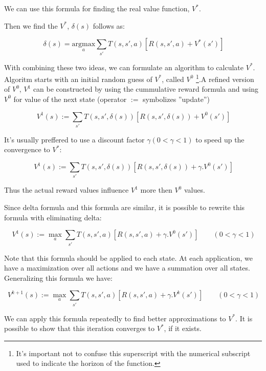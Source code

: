 We can use this formula for finding the real value function, $V^*$.

Then we find the $V^*$, $\delta(s)$ follows as:

\begin{displaymath}
\ \delta(s) = \underset{a}{\mbox{argmax}} \sum_{s'} T(s,s',a) [ R(s, s', a) + V^* (s')]
\end{displaymath}

With combining these two ideas, we can formulate an algorithm to calculate $V^*$. Algoritm starts with an initial random guess of $V^*$, called $V^0$ \footnote{It's important not to confuse this superscript with the numerical subscript used to indicate the horizon of the function.}.A refined version of $V^0$, $V^1$ can be constructed by using the cummulative reward formula and using $V^0$ for value of the next state (operator $:=$ symbolizes ''update'')

\begin{displaymath}
\ V^1(s) := \sum_{s'} T(s ,s', \delta(s)) [ R(s, s', \delta(s)) + V^0 (s')]
\end{displaymath}

It's usually preffered to use a discount factor $\gamma (0 < \gamma < 1)$ to speed up the convergence to $V^*$:

\begin{displaymath}
\ V^1(s) := \sum_{s'} T(s ,s', \delta(s)) [ R(s, s', \delta(s)) + \gamma . V^0 (s')]
\end{displaymath}

Thus the actual reward values influence $V^1$ more then $V^0$ values.

Since delta formula and this formula are similar, it is possible to rewrite this formula with eliminating delta:

\begin{displaymath}
\ V^1(s) := \max_a \sum_{s'} T(s ,s', a) [ R(s, s', a) + \gamma . V^0 (s')] \qquad (0 < \gamma <1 )
\end{displaymath}

Note that this formula should be applied to each state. At each application, we have a maximization over all actions and we have a summation over all states. Generalizing this formula we have:

\begin{displaymath}
\ V^{k+1}(s) := \max_a \sum_{s'} T(s ,s', a) [ R(s, s', a) + \gamma . V^k (s')] \qquad (0 < \gamma <1 )
\end{displaymath}

We can apply this formula repeatedly to find better approximations to $V^*$. It is possible to show that this iteration converges to $V^*$, if it exists.

